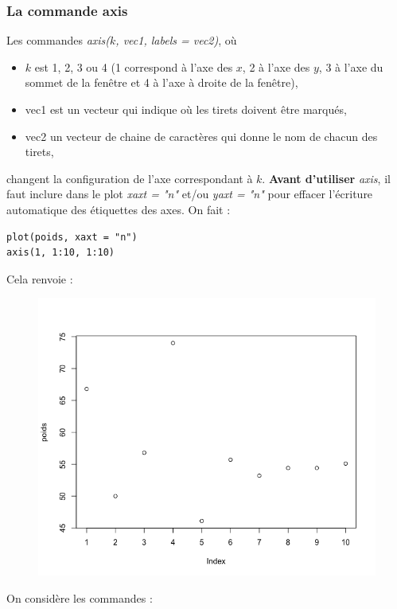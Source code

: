\subsubsection{La commande axis}
Les commandes \textit{axis($k$, vec1, labels = vec2)}, où
\begin{itemize}
\item $k$ est 1, 2, 3 ou 4 (1 correspond à l'axe des $x$, 2 à l'axe des $y$, 3 à l'axe du sommet de la fenêtre et 4 à l'axe à droite de la fenêtre),
\item vec1 est un vecteur qui indique où les tirets doivent être marqués,
\item vec2 un vecteur de chaine de caractères qui donne le nom de chacun des tirets,
\end{itemize}
changent la configuration de l'axe correspondant à $k$.\newline
\textbf{Avant d'utiliser} \textit{axis}, il faut inclure dans le plot \textit{xaxt = "n"} et/ou \textit{yaxt = "n"} pour effacer l'écriture automatique des étiquettes des axes.\newline
On fait :
\begin{lstlisting}[language=html]
plot(poids, xaxt = "n")
axis(1, 1:10, 1:10)
\end{lstlisting}
Cela renvoie :
\begin{figure}[H]\begin{center}\includegraphics[scale=0.4]{ilu/gra65.png}\end{center}\end{figure}
On considère les commandes :
